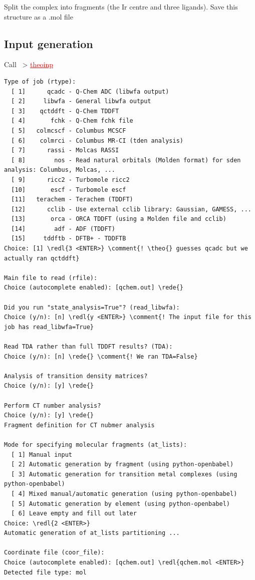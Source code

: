 \documentclass[DIV=12,headings=normal]{scrartcl}
\newcommand{\comment}[1]{\textcolor{blue}{#1}}
\newcommand{\redl}[1]{{\textcolor{red}{\underline{#1}}}}
\newcommand{\rede}[1]{\redl{#1 <ENTER>}}
\newcommand{\comm}[1]{
\small
~> \redl{#1}
\normalsize
}
\newcommand{\theo}{\textsc{TheoDORE}}
\newcounter{number}
\begin{document}
Split the complex into fragments (the Ir centre and three ligands). Save this structure as a .mol file
\subsection{Input generation}
Call \comm{theoinp}
\scriptsize
\begin{Verbatim}[commandchars=\\\{\}]
Type of job (rtype):
  [ 1]      qcadc - Q-Chem ADC (libwfa output)
  [ 2]     libwfa - General libwfa output
  [ 3]    qctddft - Q-Chem TDDFT
  [ 4]       fchk - Q-Chem fchk file
  [ 5]   colmcscf - Columbus MCSCF
  [ 6]    colmrci - Columbus MR-CI (tden analysis)
  [ 7]      rassi - Molcas RASSI
  [ 8]        nos - Read natural orbitals (Molden format) for sden analysis: Columbus, Molcas, ...
  [ 9]      ricc2 - Turbomole ricc2
  [10]       escf - Turbomole escf
  [11]   terachem - Terachem (TDDFT)
  [12]      cclib - Use external cclib library: Gaussian, GAMESS, ...
  [13]       orca - ORCA TDDFT (using a Molden file and cclib)
  [14]        adf - ADF (TDDFT)
  [15]     tddftb - DFTB+ - TDDFTB
Choice: [1] \redl{3 <ENTER>} \comment{! \theo{} guesses qcadc but we actually ran qctddft}

Main file to read (rfile):
Choice (autocomplete enabled): [qchem.out] \rede{}

Did you run "state_analysis=True"? (read_libwfa):
Choice (y/n): [n] \redl{y <ENTER>} \comment{! The input file for this job has read_libwfa=True} 

Read TDA rather than full TDDFT results? (TDA):
Choice (y/n): [n] \rede{} \comment{! We ran TDA=False}

Analysis of transition density matrices?
Choice (y/n): [y] \rede{}

Perform CT number analysis?
Choice (y/n): [y] \rede{}
Fragment definition for CT nubmer analysis

Mode for specifying molecular fragments (at_lists):
  [ 1] Manual input
  [ 2] Automatic generation by fragment (using python-openbabel)
  [ 3] Automatic generation for transition metal complexes (using python-openbabel)
  [ 4] Mixed manual/automatic generation (using python-openbabel)
  [ 5] Automatic generation by element (using python-openbabel)
  [ 6] Leave empty and fill out later
Choice: \redl{2 <ENTER>}
Automatic generation of at_lists partitioning ...

Coordinate file (coor_file):
Choice (autocomplete enabled): [qchem.out] \redl{qchem.mol <ENTER>} 
Detected file type: mol


\end{Verbatim}
\end{document}
